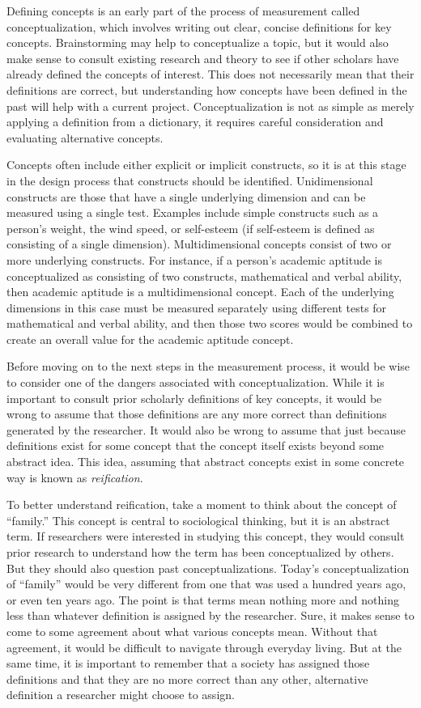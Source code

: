Defining concepts is an early part of the process of measurement called conceptualization, which involves writing out clear, concise definitions for key concepts. Brainstorming may help to conceptualize a topic, but it would also make sense to consult existing research and theory to see if other scholars have already defined the concepts of interest. This does not necessarily mean that their definitions are correct, but understanding how concepts have been defined in the past will help with a current project. Conceptualization is not as simple as merely applying a definition from a dictionary, it requires careful consideration and evaluating alternative concepts.

Concepts often include either explicit or implicit constructs, so it is at this stage in the design process that constructs should be identified. Unidimensional constructs are those that have a single underlying dimension and can be measured using a single test. Examples include simple constructs such as a person's weight, the wind speed, or self-esteem (if self-esteem is defined as consisting of a single dimension). Multidimensional concepts consist of two or more underlying constructs. For instance, if a person's academic aptitude is conceptualized as consisting of two constructs, mathematical and verbal ability, then academic aptitude is a multidimensional concept. Each of the underlying dimensions in this case must be measured separately using different tests for mathematical and verbal ability, and then those two scores would be combined to create an overall value for the academic aptitude concept.

Before moving on to the next steps in the measurement process, it would be wise to consider one of the dangers associated with conceptualization. While it is important to consult prior scholarly definitions of key concepts, it would be wrong to assume that those definitions are any more correct than definitions generated by the researcher. It would also be wrong to assume that just because definitions exist for some concept that the concept itself exists beyond some abstract idea. This idea, assuming that abstract concepts exist in some concrete way is known as \textit{reification}.

To better understand reification, take a moment to think about the concept of ``family.'' This concept is central to sociological thinking, but it is an abstract term. If researchers were interested in studying this concept, they would consult prior research to understand how the term has been conceptualized by others. But they should also question past conceptualizations. Today's conceptualization of ``family'' would be very different from one that was used a hundred years ago, or even ten years ago. The point is that terms mean nothing more and nothing less than whatever definition is assigned by the researcher. Sure, it makes sense to come to some agreement about what various concepts mean. Without that agreement, it would be difficult to navigate through everyday living. But at the same time, it is important to remember that a society has assigned those definitions and that they are no more correct than any other, alternative definition a researcher might choose to assign.

